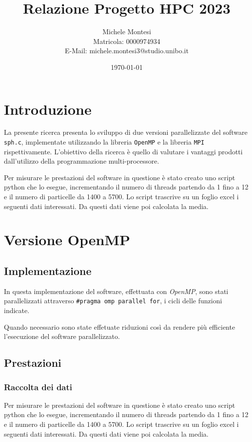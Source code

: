 \documentclass[a4paper, 12pt]{report}
\title{Relazione Progetto HPC 2023}
\author{Michele Montesi \\
        Matricola: 0000974934 \\
        E-Mail: michele.montesi3@studio.unibo.it}
\date{\today}
\begin{document}
\maketitle

\chapter*{Introduzione}
\begin{sloppypar}
La presente ricerca presenta lo sviluppo di due versioni parallelizzate del software \texttt{sph.c}, 
implementate utilizzando la libreria \texttt{OpenMP} e la libreria \texttt{MPI} rispettivamente. 
L'obiettivo della ricerca è quello di valutare i vantaggi prodotti dall'utilizzo della programmazione multi-processore.
\end{sloppypar}

\bigskip

\begin{sloppypar}
\noindent
Per misurare le prestazioni del software in questione è stato creato uno script python che lo esegue, incrementando
il numero di threads partendo da 1 fino a 12 e il numero di particelle da 1400 a 5700.
Lo script trascrive su un foglio excel i seguenti dati interessati.
Da questi dati viene poi calcolata la media.
\end{sloppypar}

{\let\clearpage\relax\chapter*{Versione OpenMP}}
\section*{Implementazione}
\begin{sloppypar}
  \noindent
  In questa implementazione del software, effettuata con \textit{OpenMP}, sono stati parallelizzati attraverso 
  \texttt{\#pragma omp parallel for}, i cicli delle funzioni indicate.

  \smallskip
  \noindent
  Quando necessario sono state effetuate riduzioni così da rendere più efficiente l'esecuzione del software parallelizzato.
\end{sloppypar}

\section*{Prestazioni}
\subsection*{Raccolta dei dati}
\begin{sloppypar}
  \noindent
  Per misurare le prestazioni del software in questione è stato creato uno script python che lo esegue, incrementando
  il numero di threads partendo da 1 fino a 12 e il numero di particelle da 1400 a 5700.
  Lo script trascrive su un foglio excel i seguenti dati interessati.
  Da questi dati viene poi calcolata la media.
\end{sloppypar}
\end{document}
